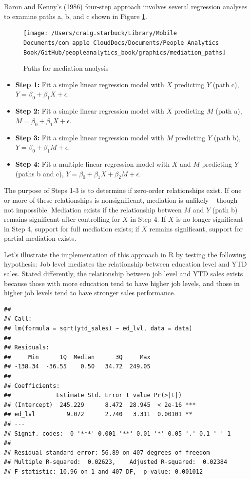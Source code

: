 \documentclass[
]{book}
\providecommand{\tightlist}{%
  \setlength{\itemsep}{0pt}\setlength{\parskip}{0pt}}
\begin{document}
Baron and Kenny's (1986) four-step approach involves several regression analyses to examine paths a, b, and c shown in Figure \ref{fig:med-paths}.

\begin{figure}

{\centering \texttt{[image: /Users/craig.starbuck/Library/Mobile Documents/com~apple~CloudDocs/Documents/People Analytics Book/GitHub/peopleanalytics\_book/graphics/mediation\_paths]} 

}

\caption{Paths for mediation analysis}\label{fig:med-paths}
\end{figure}

\begin{itemize}
\tightlist
\item
  \textbf{Step 1:} Fit a simple linear regression model with \(X\) predicting \(Y\) (path c), \(Y = \beta_0 + \beta_1 X + \epsilon\).
\item
  \textbf{Step 2:} Fit a simple linear regression model with \(X\) predicting \(M\) (path a), \(M = \beta_0 + \beta_1 X + \epsilon\).
\item
  \textbf{Step 3:} Fit a simple linear regression model with \(M\) predicting \(Y\) (path b), \(Y = \beta_0 + \beta_1 M + \epsilon\).
\item
  \textbf{Step 4:} Fit a multiple linear regression model with \(X\) and \(M\) predicting \(Y\) (paths b and c), \(Y = \beta_0 + \beta_1 X + \beta_2 M + \epsilon\).
\end{itemize}

The purpose of Steps 1-3 is to determine if zero-order relationships exist. If one or more of these relationships is nonsignificant, mediation is unlikely -- though not impossible. Mediation exists if the relationship between \(M\) and \(Y\) (path b) remains significant after controlling for \(X\) in Step 4. If \(X\) is no longer significant in Step 4, support for full mediation exists; if \(X\) remains significant, support for partial mediation exists.

Let's illustrate the implementation of this approach in R by testing the following hypothesis: Job level mediates the relationship between education level and YTD sales. Stated differently, the relationship between job level and YTD sales exists because those with more education tend to have higher job levels, and those in higher job levels tend to have stronger sales performance.

\begin{verbatim}
## 
## Call:
## lm(formula = sqrt(ytd_sales) ~ ed_lvl, data = data)
## 
## Residuals:
##     Min      1Q  Median      3Q     Max 
## -138.34  -36.55    0.50   34.72  249.05 
## 
## Coefficients:
##             Estimate Std. Error t value Pr(>|t|)    
## (Intercept)  245.229      8.472  28.945  < 2e-16 ***
## ed_lvl         9.072      2.740   3.311  0.00101 ** 
## ---
## Signif. codes:  0 '***' 0.001 '**' 0.01 '*' 0.05 '.' 0.1 ' ' 1
## 
## Residual standard error: 56.89 on 407 degrees of freedom
## Multiple R-squared:  0.02623,    Adjusted R-squared:  0.02384 
## F-statistic: 10.96 on 1 and 407 DF,  p-value: 0.001012
\end{verbatim}
\end{document}
